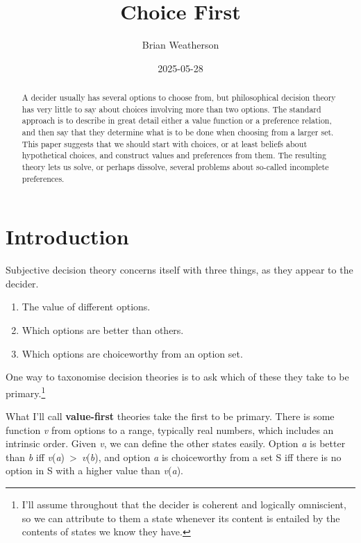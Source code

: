\documentclass[
  12pt,
  letterpaper,
  DIV=11,
  numbers=noendperiod]{scrartcl}
\title{Choice First}
\author{Brian Weatherson}
\date{2025-05-28}
\providecommand{\tightlist}{%
  \setlength{\itemsep}{0pt}\setlength{\parskip}{0pt}}
\begin{document}
\maketitle
\begin{abstract}
A decider usually has several options to choose from, but philosophical
decision theory has very little to say about choices involving more than
two options. The standard approach is to describe in great detail either
a value function or a preference relation, and then say that they
determine what is to be done when choosing from a larger set. This paper
suggests that we should start with choices, or at least beliefs about
hypothetical choices, and construct values and preferences from them.
The resulting theory lets us solve, or perhaps dissolve, several
problems about so-called incomplete preferences.
\end{abstract}


\section{Introduction}\label{sec-intro}

Subjective decision theory concerns itself with three things, as they
appear to the decider.

\begin{enumerate}
\def\labelenumi{\arabic{enumi}.}
\tightlist
\item
  The value of different options.
\item
  Which options are better than others.
\item
  Which options are choiceworthy from an option set.
\end{enumerate}

One way to taxonomise decision theories is to ask which of these they
take to be primary.\footnote{I'll assume throughout that the decider is
  coherent and logically omniscient, so we can attribute to them a state
  whenever its content is entailed by the contents of states we know
  they have.}

What I'll call \textbf{value-first} theories take the first to be
primary. There is some function \emph{v} from options to a range,
typically real numbers, which includes an intrinsic order. Given
\emph{v}, we can define the other states easily. Option \emph{a} is
better than \emph{b} iff
\emph{v}(\emph{a})~\textgreater~\emph{v}(\emph{b}), and option \emph{a}
is choiceworthy from a set S iff there is no option in S with a higher
value than \emph{v}(\emph{a}).
\end{document}

